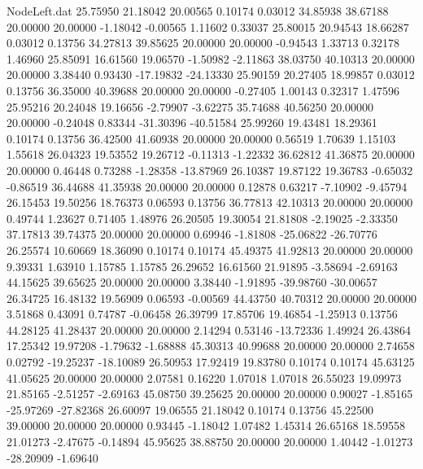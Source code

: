 \begin{filecontents}{NodeLeft.dat}
  25.75950   21.18042   20.00565     0.10174    0.03012   34.85938   38.67188   20.00000   20.00000   -1.18042   -0.00565    1.11602    0.33037
  25.80015   20.94543   18.66287     0.03012    0.13756   34.27813   39.85625   20.00000   20.00000   -0.94543    1.33713    0.32178    1.46960
  25.85091   16.61560   19.06570    -1.50982   -2.11863   38.03750   40.10313   20.00000   20.00000    3.38440    0.93430  -17.19832  -24.13330
  25.90159   20.27405   18.99857     0.03012    0.13756   36.35000   40.39688   20.00000   20.00000   -0.27405    1.00143    0.32317    1.47596
  25.95216   20.24048   19.16656    -2.79907   -3.62275   35.74688   40.56250   20.00000   20.00000   -0.24048    0.83344  -31.30396  -40.51584
  25.99260   19.43481   18.29361     0.10174    0.13756   36.42500   41.60938   20.00000   20.00000    0.56519    1.70639    1.15103    1.55618
  26.04323   19.53552   19.26712    -0.11313   -1.22332   36.62812   41.36875   20.00000   20.00000    0.46448    0.73288   -1.28358  -13.87969
  26.10387   19.87122   19.36783    -0.65032   -0.86519   36.44688   41.35938   20.00000   20.00000    0.12878    0.63217   -7.10902   -9.45794
  26.15453   19.50256   18.76373     0.06593    0.13756   36.77813   42.10313   20.00000   20.00000    0.49744    1.23627    0.71405    1.48976
  26.20505   19.30054   21.81808    -2.19025   -2.33350   37.17813   39.74375   20.00000   20.00000    0.69946   -1.81808  -25.06822  -26.70776
  26.25574   10.60669   18.36090     0.10174    0.10174   45.49375   41.92813   20.00000   20.00000    9.39331    1.63910    1.15785    1.15785
  26.29652   16.61560   21.91895    -3.58694   -2.69163   44.15625   39.65625   20.00000   20.00000    3.38440   -1.91895  -39.98760  -30.00657
  26.34725   16.48132   19.56909     0.06593   -0.00569   44.43750   40.70312   20.00000   20.00000    3.51868    0.43091    0.74787   -0.06458
  26.39799   17.85706   19.46854    -1.25913    0.13756   44.28125   41.28437   20.00000   20.00000    2.14294    0.53146  -13.72336    1.49924
  26.43864   17.25342   19.97208    -1.79632   -1.68888   45.30313   40.99688   20.00000   20.00000    2.74658    0.02792  -19.25237  -18.10089
  26.50953   17.92419   19.83780     0.10174    0.10174   45.63125   41.05625   20.00000   20.00000    2.07581    0.16220    1.07018    1.07018
  26.55023   19.09973   21.85165    -2.51257   -2.69163   45.08750   39.25625   20.00000   20.00000    0.90027   -1.85165  -25.97269  -27.82368
  26.60097   19.06555   21.18042     0.10174    0.13756   45.22500   39.00000   20.00000   20.00000    0.93445   -1.18042    1.07482    1.45314
  26.65168   18.59558   21.01273    -2.47675   -0.14894   45.95625   38.88750   20.00000   20.00000    1.40442   -1.01273  -28.20909   -1.69640

\end{filecontents}
